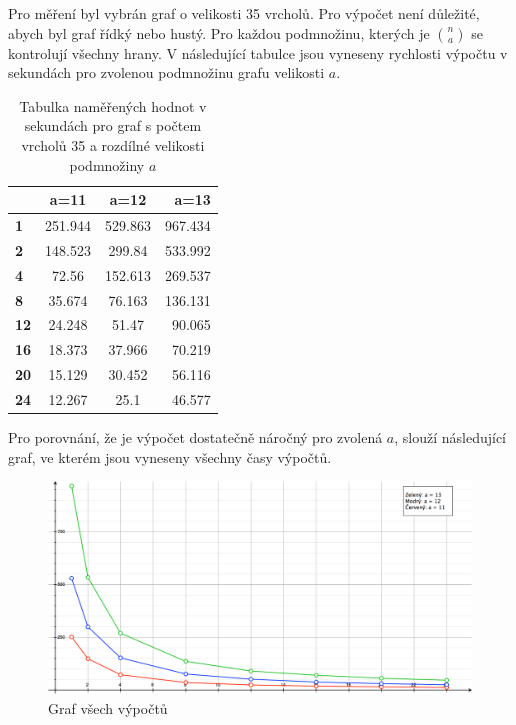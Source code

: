 \documentclass[12pt]{article}
\begin{document}
Pro měření byl vybrán graf o velikosti 35 vrcholů. Pro výpočet není důležité, abych byl graf řídký nebo hustý. Pro každou podmnožinu, kterých je ${n \choose a}$ se kontrolují všechny hrany. V následující tabulce jsou vyneseny rychlosti výpočtu v sekundách pro zvolenou podmnožinu grafu velikosti $a$.

\begin{table}[ht]
	\centering
	\begin{tabular}{ | l | c | c | r | }
		\hline
		 & \textbf{a=11} & \textbf{a=12} & \textbf{a=13} \\ \hline
		\textbf{1} & 251.944 & 529.863 & 967.434 \\ \hline
		\textbf{2} & 148.523 & 299.84 & 533.992 \\ \hline
		\textbf{4} & 72.56 & 152.613 & 269.537 \\ \hline
		\textbf{8} & 35.674 & 76.163 & 136.131 \\ \hline
		\textbf{12} & 24.248 & 51.47 & 90.065 \\ \hline
		\textbf{16} & 18.373 & 37.966 & 70.219 \\ \hline
		\textbf{20} & 15.129 & 30.452 & 56.116 \\ \hline
		\textbf{24} & 12.267 & 25.1 & 46.577 \\ \hline
	\end{tabular}
	\caption{Tabulka naměřených hodnot v sekundách pro graf s počtem vrcholů 35 a rozdílné velikosti podmnožiny $a$}
   \label{fig:spe}
\end{table}

Pro porovnání, že je výpočet dostatečně náročný pro zvolená $a$, slouží následující graf, ve kterém jsou vyneseny všechny časy výpočtů.

\begin{figure}[H]
  \centering
    \includegraphics[width=1\textwidth]{./graph1.png}
  \caption{Graf všech výpočtů}
  \label{fig:con}
\end{figure}
\end{document}

